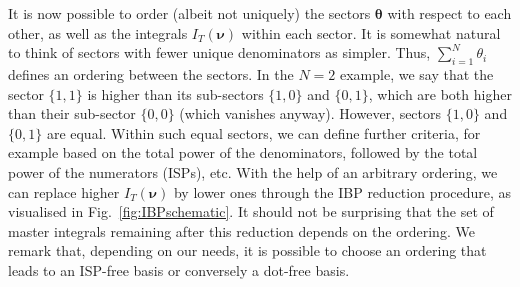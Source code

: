 \documentclass[main.tex]{subfiles}
\begin{document}
It is now possible to order (albeit not uniquely) the sectors $\bm{\theta}$ with respect to each other, as well as the integrals $I_T(\bm{\nu})$ within each sector. It is somewhat natural to think of sectors with fewer unique denominators as simpler. Thus, $\sum_{i=1}^N \theta_i$ defines an ordering between the sectors. In the $N=2$ example, we say that the sector $\{1, 1\}$ is higher than its sub-sectors $\{1, 0\}$ and $\{0, 1\}$, which are both higher than their sub-sector $\{0, 0\}$ (which vanishes anyway). However, sectors $\{1, 0\}$ and $\{0, 1\}$ are equal. Within such equal sectors, we can define further criteria, for example based on the total power of the denominators, followed by the total power of the numerators (ISPs), etc. With the help of an arbitrary ordering, we can replace higher $I_T(\bm{\nu})$ by lower ones through the IBP reduction procedure, as visualised in Fig.~\ref{fig:IBPschematic}. It should not be surprising that the set of master integrals remaining after this reduction depends on the ordering. We remark that, depending on our needs, it is possible to choose an ordering that leads to an ISP-free basis or conversely a dot-free basis.
\end{document}

